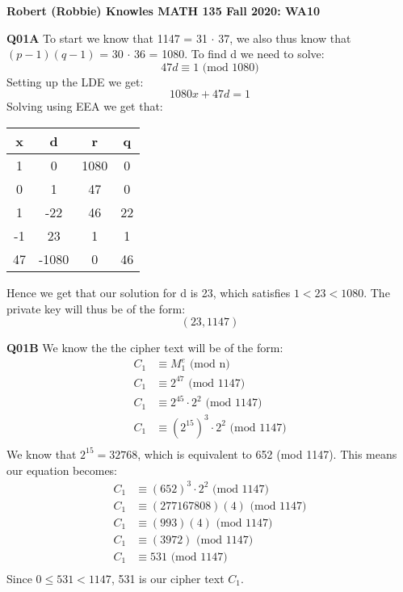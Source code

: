 \documentclass[11pt]{article}
\begin{document}
\parindent=0pt

\textbf{Robert (Robbie) Knowles MATH 135 Fall 2020: WA10}

\textbf{Q01A} To start we know that 1147 = 31 $\cdot$ 37, we also thus know that $(p-1)(q-1)$ = 30 $\cdot$ 36 = 1080. To find d we need to solve:
\[ 47d \equiv 1 \text{ (mod 1080)} \]
Setting up the LDE we get:
\[ 1080x + 47d = 1 \]
Solving using EEA we get that:
\begin{center}
 \begin{tabular}{|| c | c | c | c ||} 
 \hline
  x & d & r & q\\ 
 \hline
\hline
1 & 0 & 1080 & 0\\ 
0 & 1 & 47 & 0\\ 
 1 & -22 & 46 & 22\\ 
 -1 & 23 & 1 & 1\\ 
 47 & -1080 & 0 & 46\\ 
\hline
\end{tabular}
\end{center}
Hence we get that our solution for d is 23, which satisfies $1 < 23 < 1080$. The private key will thus be of the form:
\[ (23, 1147) \]

\textbf{Q01B} We know the the cipher text will be of the form:
\begin{align*}
 C_1 & \equiv M_1^e \text{ (mod n)} \\
 C_1  & \equiv 2^{47}  \text{ (mod 1147)} \\
 C_1  & \equiv 2^{45}\cdot2^2  \text{ (mod 1147)} \\
 C_1  & \equiv (2^{15})^3\cdot2^2  \text{ (mod 1147)} \\
\end{align*}
We know that $2^{15} = 32768$, which is equivalent to 652 (mod 1147). This means our equation becomes:
\begin{align*}
 C_1  & \equiv (652)^3\cdot2^2  \text{ (mod 1147)} \\
 C_1  & \equiv (277167808)(4)  \text{ (mod 1147)} \\
 C_1  & \equiv (993)(4)  \text{ (mod 1147)} \\
 C_1  & \equiv (3972)  \text{ (mod 1147)} \\
 C_1  & \equiv 531  \text{ (mod 1147)} \\
\end{align*}
Since $ 0 \leq 531 < 1147 $, 531 is our cipher text $C_1$.
\end{document}
